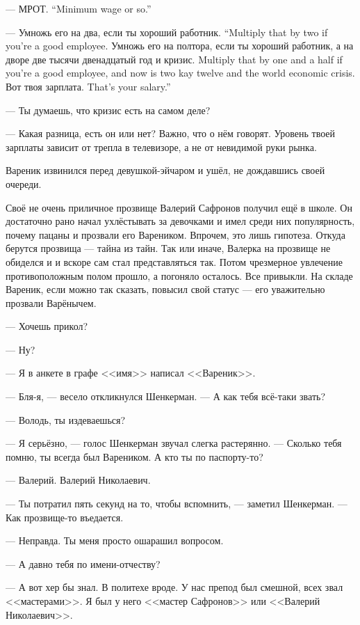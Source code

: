 {--- МРОТ.}
{``Minimum wage or so.''}

{--- Умножь его на два, если ты хороший работник.}
{``Multiply that by two if you're a good employee.}
{Умножь его на полтора, если ты хороший работник, а на дворе две тысячи двенадцатый год и кризис.}
{Multiply that by one and a half if you're a good employee, and now is two kay twelve and the world economic crisis.}
{Вот твоя зарплата.}
{That's your salary.''}

--- Ты думаешь, что кризис есть на самом деле?

--- Какая разница, есть он или нет?
Важно, что о нём говорят.
Уровень твоей зарплаты зависит от трепла в телевизоре, а не от невидимой руки рынка.

Вареник извинился перед девушкой-эйчаром и ушёл, не дождавшись своей очереди.

\asterism

Своё не очень приличное прозвище Валерий Сафронов получил ещё в школе.
Он достаточно рано начал ухлёстывать за девочками и имел среди них популярность, почему пацаны и прозвали его Вареником.
Впрочем, это лишь гипотеза.
Откуда берутся прозвища --- тайна из тайн.
Так или иначе, Валерка на прозвище не обиделся и и вскоре сам стал представляться так.
Потом чрезмерное увлечение противоположным полом прошло, а погоняло осталось.
Все привыкли.
На складе Вареник, если можно так сказать, повысил свой статус --- его уважительно прозвали Варёнычем.

\textspace

--- Хочешь прикол?

--- Ну?

--- Я в анкете в графе <<имя>> написал <<Вареник>>.

--- Бля-я, --- весело откликнулся Шенкерман.
--- А как тебя всё-таки звать?

--- Володь, ты издеваешься?

--- Я серьёзно, --- голос Шенкерман звучал слегка растерянно.
--- Сколько тебя помню, ты всегда был Вареником.
А кто ты по паспорту-то?

--- Валерий.
Валерий Николаевич.

--- Ты потратил пять секунд на то, чтобы вспомнить, --- заметил Шенкерман.
--- Как прозвище-то въедается.

--- Неправда.
Ты меня просто ошарашил вопросом.

--- А давно тебя по имени-отчеству?

--- А вот хер бы знал.
В политехе вроде.
У нас препод был смешной, всех звал <<мастерами>>.
Я был у него <<мастер Сафронов>> или <<Валерий Николаевич>>.

